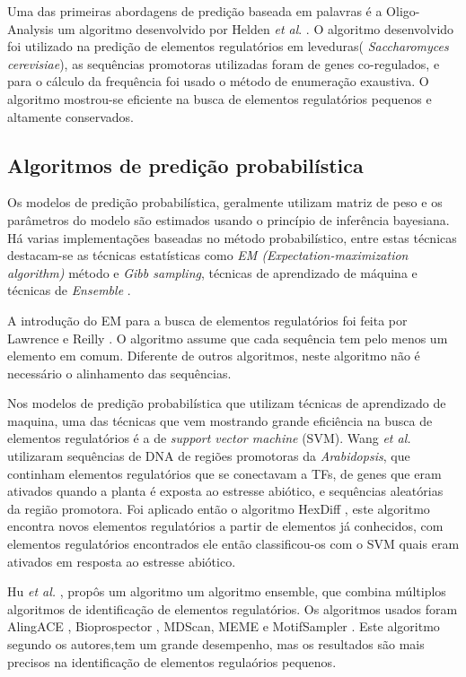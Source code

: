 Uma das primeiras abordagens de predição baseada em palavras é a Oligo-Analysis um algoritmo desenvolvido por Helden \textit{et al}. \cite{Helden1998}. O algoritmo desenvolvido foi utilizado na predição de elementos regulatórios em leveduras( \textit{Saccharomyces cerevisiae}), as sequências promotoras utilizadas foram de genes co-regulados, e para o cálculo da frequência foi usado o método de enumeração exaustiva. O algoritmo mostrou-se eficiente na busca de elementos regulatórios pequenos e altamente conservados.



\subsection{Algoritmos de predição probabilística}

Os modelos de predição probabilística, geralmente utilizam matriz de peso e os parâmetros do modelo são estimados usando o princípio de inferência bayesiana. Há varias implementações baseadas no método probabilístico, entre estas técnicas destacam-se as técnicas estatísticas como \textit{EM (Expectation-maximization algorithm)} método e \textit{Gibb sampling}, técnicas de aprendizado de máquina e técnicas de \textit{Ensemble} \cite{Das2007}.

A introdução do EM para a busca de elementos regulatórios foi feita por Lawrence e Reilly \cite{Lawrence1990}. O algoritmo assume que cada sequência tem pelo menos um elemento em comum. Diferente de outros algoritmos, neste algoritmo não é necessário o alinhamento das sequências.

Nos modelos de predição probabilística que utilizam técnicas de aprendizado de maquina, uma das técnicas que vem mostrando grande eficiência na busca de elementos regulatórios é a de \textit{support vector machine} (SVM). Wang \textit{et al.} \cite{Wang2009} utilizaram sequências de DNA de regiões promotoras da \textit{Arabidopsis}, que continham elementos regulatórios que se conectavam a TFs, de genes que eram ativados quando a planta é exposta ao estresse abiótico, e sequências aleatórias da região promotora. Foi aplicado então o algoritmo HexDiff \cite{Chan2005}, este algoritmo encontra novos elementos regulatórios a partir de elementos já conhecidos, com elementos regulatórios encontrados ele então classificou-os com o SVM quais eram ativados em resposta ao estresse abiótico.

Hu \textit{et al.} \cite{Hu2005}, propôs um algoritmo um algoritmo ensemble, que combina múltiplos algoritmos de identificação de elementos regulatórios. Os algoritmos usados foram AlingACE \cite{Roth1998} , Bioprospector \cite{LiuBrutlag2001}, MDScan\cite{LiuBrutlag2002}, MEME \cite{Bailey2006} e MotifSampler \cite{Thijs2002}. Este algoritmo segundo os autores,tem um grande desempenho, mas os resultados são mais precisos na identificação de elementos regulaórios pequenos.

